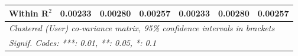 \begin{table}[htbp]
\begin{threeparttable}[b]
\begin{tabular}{lcccccc}
         Within R$^2$               & 0.00233        & 0.00280         & 0.00257         & 0.00233         & 0.00280         & 0.00257\\  
         \midrule \midrule
         \multicolumn{7}{l}{\emph{Clustered (User) co-variance matrix, 95\% confidence intervals in brackets}}\\
         \multicolumn{7}{l}{\emph{Signif. Codes: ***: 0.01, **: 0.05, *: 0.1}}\\
      \end{tabular}
   \end{threeparttable}
\end{table}


